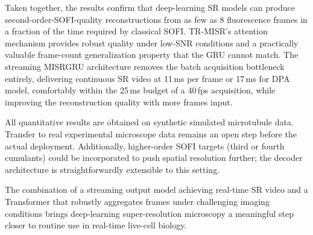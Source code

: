 Taken together, the results confirm that deep-learning SR models can produce
second-order-SOFI-quality reconstructions from as few as 8 fluorescence frames in a
fraction of the time required by classical SOFI.
TR-MISR's attention mechanism provides robust quality under low-SNR conditions and a
practically valuable frame-count generalization property that the GRU cannot match.
The streaming MISRGRU architecture removes the batch acquisition bottleneck entirely,
delivering continuous SR video at 11\,ms per frame or 17\,ms for DPA model, comfortably within the 25\,ms budget
of a 40\,fps acquisition, while improving the reconstruction quality with more frames input.

All quantitative results are obtained on synthetic simulated microtubule data.
Transfer to real experimental microscope data remains an open step before the actual deployment.
Additionally, higher-order SOFI targets (third or fourth cumulants) could be incorporated
to push spatial resolution further; the decoder architecture is straightforwardly
extensible to this setting.

The combination of a streaming output model achieving real-time SR video
and a Transformer that robustly aggregates frames under challenging imaging conditions
brings deep-learning super-resolution microscopy a meaningful step closer to routine use
in real-time live-cell biology.
